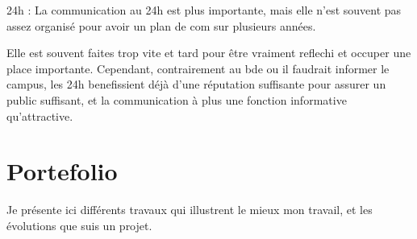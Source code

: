     24h : La communication au 24h est plus importante, mais elle n'est souvent pas assez organisé pour avoir un plan de com sur plusieurs années.
    
Elle est souvent faites trop vite et tard pour être vraiment reflechi et occuper une place importante.
Cependant, contrairement au bde ou il faudrait informer le campus, les 24h benefissient déjà d'une réputation suffisante pour assurer un public suffisant, et la communication à plus une fonction informative qu'attractive.




\section{Portefolio}

    Je présente ici différents travaux qui illustrent le mieux mon travail, et les évolutions que suis un projet.
